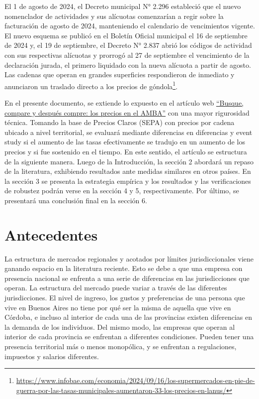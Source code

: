 El 1 de agosto de 2024, el Decreto municipal N° 2.296 estableció que el nuevo nomenclador de actividades y sus alícuotas comenzarían a regir sobre la facturación de agosto de 2024, manteniendo el calendario de vencimientos vigente. El nuevo esquema se publicó en el Boletín Oficial municipal el 16 de septiembre de 2024 y, el 19 de septiembre, el Decreto N° 2.837 abrió los códigos de actividad con sus respectivas alícuotas y prorrogó al 27 de septiembre el vencimiento de la declaración jurada, el primero liquidado con la nueva alícuota a partir de agosto. Las cadenas que operan en grandes superficies respondieron de inmediato y anunciaron un traslado directo a los precios de góndola\footnote{\url{https://www.infobae.com/economia/2024/09/16/los-supermercados-en-pie-de-guerra-por-las-tasas-municipales-aumentaron-33-los-precios-en-lanus/}}.

En el presente documento, se extiende lo expuesto en el artículo web \href{https://kevinlpagnotta.github.io/precios-sepa/}{\enquote{Busque, compare y después compre: los precios en el AMBA}} con una mayor rigurosidad técnica. Tomando la base de Precios Claros (SEPA) con precios por cadena ubicado a nivel territorial, se evaluará mediante diferencias en diferencias y event study si el aumento de las tasas efectivamente se tradujo en un aumento de los precios y si fue sostenido en el tiempo. En este sentido, el artículo se estructura de la siguiente manera. Luego de la Introducción, la sección 2 abordará un repaso de la literatura, exhibiendo resultados ante medidas similares en otros países. En la sección 3 se presenta la estrategia empírica y los resultados y las verificaciones de robustez podrán verse en la sección 4 y 5, respectivamente. Por último, se presentará una conclusión final en la sección 6.

\section{Antecedentes}

La estructura de mercados regionales y acotados por límites jurisdiccionales viene ganando espacio en la literatura reciente. Esto se debe a que una empresa con presencia nacional se enfrenta a una serie de diferencias en las jurisdicciones que operan. La estructura del mercado puede variar a través de las diferentes jurisdicciones. El nivel de ingreso, los gustos y preferencias de una persona que vive en Buenos Aires no tiene por qué ser la misma de aquella que vive en Córdoba, e incluso al interior de cada una de las provincias existen diferencias en la demanda de los individuos. Del mismo modo, las empresas que operan al interior de cada provincia se enfrentan a diferentes condiciones. Pueden tener una presencia territorial más o menos monopólica, y se enfrentan a regulaciones, impuestos y salarios diferentes.

